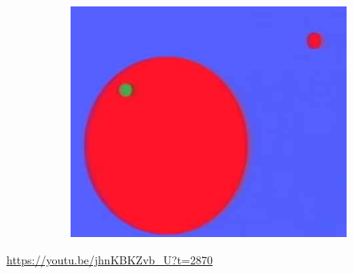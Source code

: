 \documentclass[]{article}
\begin{document}
\begin{figure}[H]
\begin{subfigure}[t]{0.45\textwidth}
		\includegraphics[width=\textwidth]{wt1ws-bubble-grows}
	\end{subfigure}
\end{figure}
	
\url{https://youtu.be/jhnKBKZvb_U?t=2870}


\raggedright

\end{document}
